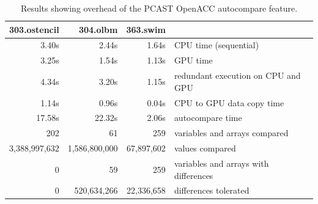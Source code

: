 
\begin{table}
\begin{center}
\begin{tabular}{r|r|r|l}
\hline
303.ostencil & 304.olbm & 363.swim & \\
\hline
 3.40s &  2.44s & 1.64s & CPU time (sequential) \\
 3.25s &  1.54s & 1.13s & GPU time \\
 4.34s &  3.20s & 1.15s & redundant execution on CPU and GPU \\
 1.14s &  0.96s & 0.04s & CPU to GPU data copy time \\
17.58s & 22.32s & 2.06s & autocompare time \\
   202 &     61 &   259 & variables and arrays compared \\
3,388,997,632 & 1,586,800,000 & 67,897,602 & values compared \\
   0   &     59 &   259 & variables and arrays with differences \\
            0 &   520,634,266 & 22,336,658 & differences tolerated \\
\hline
\end{tabular}
\end{center}
\caption{Results showing overhead of the PCAST OpenACC autocompare feature.}
\label{res1}
\end{table}

